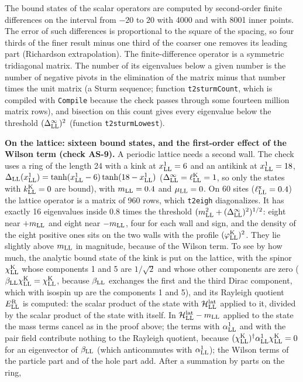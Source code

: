 \documentclass[
  10pt,
]{article}
\begin{document}
The bound states of the scalar operators are computed by second-order
finite differences on the interval from \(-20\) to \(20\) with 4000 and
with 8001 inner points. The error of such differences is proportional to
the square of the spacing, so four thirds of the finer result minus one
third of the coarser one removes its leading part (Richardson
extrapolation). The finite-difference operator is a symmetric
tridiagonal matrix. The number of its eigenvalues below a given number
is the number of negative pivots in the elimination of the matrix minus
that number times the unit matrix (a Sturm sequence; function
\texttt{t2sturmCount}, which is compiled with \texttt{Compile} because
the check passes through some fourteen million matrix rows), and
bisection on this count gives every eigenvalue below the threshold
\((\Delta^\infty_{\rm LL})^2\) (function \texttt{t2sturmLowest}).

\textbf{On the lattice: sixteen bound states, and the first-order effect
of the Wilson term (check AS-9).} A periodic lattice needs a second
wall. The check uses a ring of the length 24 with a kink at
\(x^1_{\rm LL}=6\) and an antikink at \(x^1_{\rm LL}=18\),
\(\Delta_{\rm LL}(x^1_{\rm LL})=\tanh(x^1_{\rm LL}-6)\tanh(18-x^1_{\rm LL})\)
(\(\Delta^\infty_{\rm LL}=\ell^{\rm K}_{\rm LL}=1\), so only the states
with \(k^{\rm K}_{\rm LL}=0\) are bound), with \(m_{\rm LL}=0.4\) and
\(\mu_{\rm LL}=0\). On 60 sites (\(\ell^{\rm x}_{\rm LL}=0.4\)) the
lattice operator is a matrix of 960 rows, which \texttt{t2eigh}
diagonalizes. It has exactly 16 eigenvalues inside 0.8 times the
threshold \((m_{\rm LL}^2+(\Delta^\infty_{\rm LL})^2)^{1/2}\): eight
near \(+m_{\rm LL}\) and eight near \(-m_{\rm LL}\), four for each wall
and sign, and the density of the eight positive ones sits on the two
walls with the profile \((\varphi^{\rm K}_{\rm LL})^2\). They lie
slightly above \(m_{\rm LL}\) in magnitude, because of the Wilson term.
To see by how much, the analytic bound state of the kink is put on the
lattice, with the spinor \(\chi^{\rm K}_{\rm LL}\) whose components 1
and 5 are \(1/\sqrt2\) and whose other components are zero
(\(\beta_{\rm LL}\chi^{\rm K}_{\rm LL}=\chi^{\rm K}_{\rm LL}\), because
\(\beta_{\rm LL}\) exchanges the first and the third Dirac component,
which with isospin up are the components 1 and 5), and its Rayleigh
quotient \(E^{\rm R}_{\rm LL}\) is computed: the scalar product of the
state with \(\mathcal H^{\rm lat}_{\rm LL}\) applied to it, divided by
the scalar product of the state with itself. In
\(\mathcal H^{\rm lat}_{\rm LL}-m_{\rm LL}\) applied to the state the
mass terms cancel as in the proof above; the terms with
\(\alpha^1_{\rm LL}\) and with the pair field contribute nothing to the
Rayleigh quotient, because
\((\chi^{\rm K}_{\rm LL})^\dagger\alpha^1_{\rm LL}\chi^{\rm K}_{\rm LL}=0\)
for an eigenvector of \(\beta_{\rm LL}\) (which anticommutes with
\(\alpha^1_{\rm LL}\)); the Wilson terms of the particle part and of the
hole part add. After a summation by parts on the ring,
\end{document}

